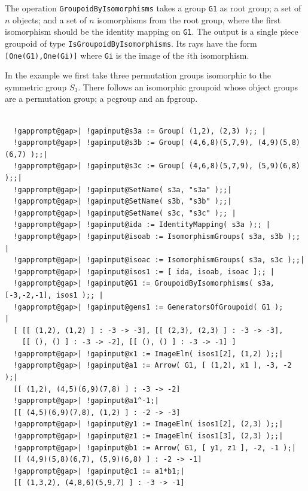 \documentclass[a4paper,11pt]{report}
\begin{document}
{{{ The operation \texttt{GroupoidByIsomorphisms} takes a group \texttt{G1} as root group; a set of $n$ objects; and a set of $n$ isomorphisms from the root group, where the first isomorphism should be the
identity mapping on \texttt{G1}. The output is a single piece groupoid of type \texttt{IsGroupoidByIsomorphisms}. Its rays have the form \texttt{[One(G1),One(Gi)]} where \texttt{Gi} is the image of the $i$\texttt{}th isomorphism. 

 In the example we first take three permutation groups isomorphic to the
symmetric group $S_3$. There follows an isomorphic groupoid whose object groups are a permutation
group; a pc\texttt{}group and an fp\texttt{}group. 

 }

 
\begin{Verbatim}[commandchars=!@|,fontsize=\small,frame=single,label=Example]
  
  !gapprompt@gap>| !gapinput@s3a := Group( (1,2), (2,3) );; |
  !gapprompt@gap>| !gapinput@s3b := Group( (4,6,8)(5,7,9), (4,9)(5,8)(6,7) );;|
  !gapprompt@gap>| !gapinput@s3c := Group( (4,6,8)(5,7,9), (5,9)(6,8) );;|
  !gapprompt@gap>| !gapinput@SetName( s3a, "s3a" );;|
  !gapprompt@gap>| !gapinput@SetName( s3b, "s3b" );;|
  !gapprompt@gap>| !gapinput@SetName( s3c, "s3c" );; |
  !gapprompt@gap>| !gapinput@ida := IdentityMapping( s3a );; |
  !gapprompt@gap>| !gapinput@isoab := IsomorphismGroups( s3a, s3b );; |
  !gapprompt@gap>| !gapinput@isoac := IsomorphismGroups( s3a, s3c );;|
  !gapprompt@gap>| !gapinput@isos1 := [ ida, isoab, isoac ];; |
  !gapprompt@gap>| !gapinput@G1 := GroupoidByIsomorphisms( s3a, [-3,-2,-1], isos1 );; |
  !gapprompt@gap>| !gapinput@gens1 := GeneratorsOfGroupoid( G1 );                    |
  [ [[ (1,2), (1,2) ] : -3 -> -3], [[ (2,3), (2,3) ] : -3 -> -3], 
    [[ (), () ] : -3 -> -2], [[ (), () ] : -3 -> -1] ]
  !gapprompt@gap>| !gapinput@x1 := ImageElm( isos1[2], (1,2) );;|
  !gapprompt@gap>| !gapinput@a1 := Arrow( G1, [ (1,2), x1 ], -3, -2 );|
  [[ (1,2), (4,5)(6,9)(7,8) ] : -3 -> -2]
  !gapprompt@gap>| !gapinput@a1^-1;|
  [[ (4,5)(6,9)(7,8), (1,2) ] : -2 -> -3]
  !gapprompt@gap>| !gapinput@y1 := ImageElm( isos1[2], (2,3) );;|
  !gapprompt@gap>| !gapinput@z1 := ImageElm( isos1[3], (2,3) );;|
  !gapprompt@gap>| !gapinput@b1 := Arrow( G1, [ y1, z1 ], -2, -1 );|
  [[ (4,9)(5,8)(6,7), (5,9)(6,8) ] : -2 -> -1]
  !gapprompt@gap>| !gapinput@c1 := a1*b1;|
  [[ (1,3,2), (4,8,6)(5,9,7) ] : -3 -> -1]
  

\end{Verbatim}}}
\end{document}
